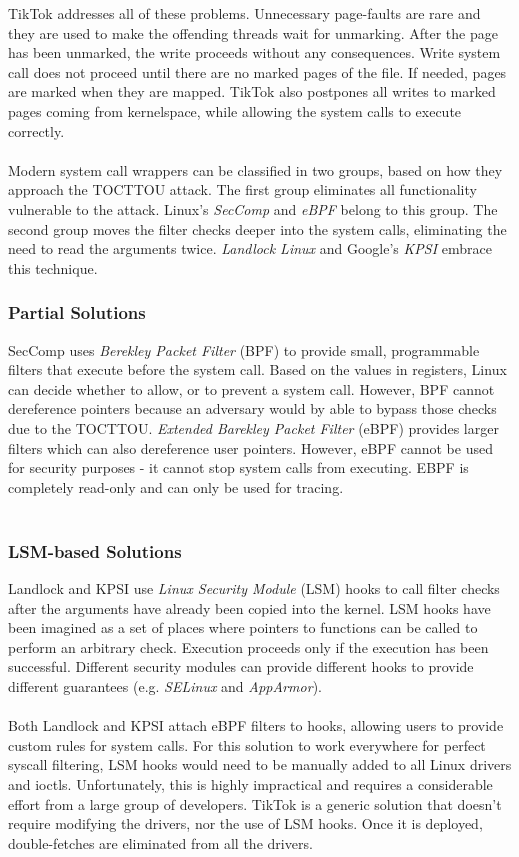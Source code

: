 TikTok addresses all of these problems. Unnecessary page-faults are rare and they are used to make the offending threads wait for unmarking. After the page has been unmarked,
the write proceeds without any consequences. Write system call does not proceed until there are no marked pages of the file. If needed, pages are marked when they are mapped. 
TikTok also postpones all writes to marked pages coming from kernelspace, while allowing the system calls to execute correctly.
\\
\\
Modern system call wrappers can be classified in two groups, based on how they approach the TOCTTOU attack. The first group eliminates all functionality vulnerable to the attack.
Linux's \emph{SecComp} and \emph{eBPF} belong to this group. The second group moves the filter checks deeper into the system calls, eliminating the need to read the arguments
twice. \emph{Landlock Linux} and Google's \emph{KPSI} embrace this technique.

\subsubsection{Partial Solutions}
SecComp uses \emph{Berekley Packet Filter} (BPF) to provide small, programmable filters that execute before the system call. Based on the values in registers, Linux can decide whether
to allow, or to prevent a system call. However, BPF cannot dereference pointers because an adversary would by able to bypass those checks due to the TOCTTOU. 
\emph{Extended Barekley Packet Filter} (eBPF) provides larger filters which can also dereference user pointers. However, eBPF cannot be used for security purposes - it cannot stop
system calls from executing. EBPF is completely read-only and can only be used for tracing.
\\
\\
\subsubsection{LSM-based Solutions}
Landlock and KPSI use \emph{Linux Security Module}\cite{lsm} (LSM) hooks to call filter checks after the arguments have already been copied into the kernel. LSM hooks have been imagined
as a set of places where pointers to functions can be called to perform an arbitrary check. Execution proceeds only if the execution has been successful. Different security modules
can provide different hooks to provide different guarantees (e.g. \emph{SELinux} and \emph{AppArmor}).
\\
\\
Both Landlock and KPSI attach eBPF filters to hooks, allowing users to provide custom rules for system calls. For this solution to work everywhere for perfect syscall filtering, 
LSM hooks would need to be manually added to all Linux drivers and ioctls. Unfortunately, this is highly impractical and requires a considerable effort from a large group of developers.
TikTok is a generic solution that doesn't require modifying the drivers, nor the use of LSM hooks. Once it is deployed, double-fetches are eliminated from all the drivers.

